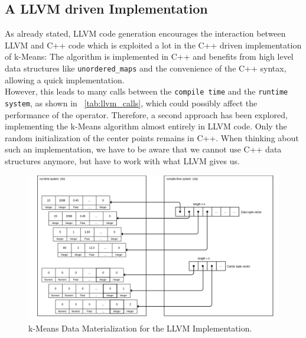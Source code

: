 \subsection{A LLVM driven Implementation}

As already stated, LLVM code generation encourages the interaction between LLVM and C++ code which is exploited a lot in the C++ driven implementation of k-Means: The algorithm is implemented in C++ and benefits from high level data structures like \texttt{unordered\_maps} and the convenience of the C++ syntax, allowing a quick implementation. 
\\
However, this leads to many calls between the \texttt{compile time} and the \texttt{runtime system}, as shown in ~\autoref{tab:llvm_calls}, which could possibly affect the performance of the operator. Therefore, a second approach has been explored, implementing the k-Means algorithm almost entirely in LLVM code. Only the random initialization of the center points remains in C++. When thinking about such an implementation, we have to be aware that we cannot use C++ data structures anymore, but have to work with what LLVM gives us.


\begin{figure}[htsb]
  \centering
  \includegraphics[scale=0.25]{figures/mat4}
  \caption[k-Means Data Materialization for the LLVM Implementation]{k-Means Data Materialization for the LLVM Implementation.}
  \label{fig:mat4}
\end{figure}

